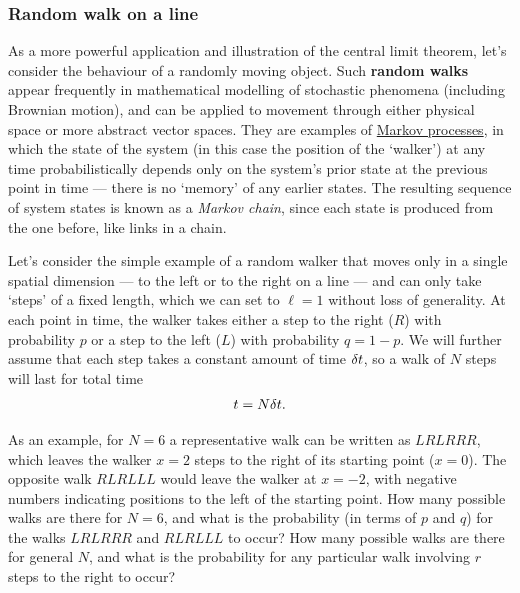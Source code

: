 \subsubsection{Random walk on a line}
As a more powerful application and illustration of the central limit theorem, let's consider the behaviour of a randomly moving object.
Such \textbf{random walks} appear frequently in mathematical modelling of stochastic phenomena (including Brownian motion), and can be applied to movement through either physical space or more abstract vector spaces.
They are examples of \href{https://en.wikipedia.org/wiki/Markov_process}{Markov processes}, in which the state of the system (in this case the position of the `walker') at any time probabilistically depends only on the system's prior state at the previous point in time --- there is no `memory' of any earlier states. %
The resulting sequence of system states is known as a \textit{Markov chain}, since each state is produced from the one before, like links in a chain. %

Let's consider the simple example of a random walker that moves only in a single spatial dimension --- to the left or to the right on a line --- and can only take `steps' of a fixed length, which we can set to $\ell = 1$ without loss of generality.
At each point in time, the walker takes either a step to the right ($R$) with probability $p$ or a step to the left ($L$) with probability $q = 1 - p$.
We will further assume that each step takes a constant amount of time $\delta t$, so a walk of $N$ steps will last for total time
\begin{equation}
  \label{eq:RWtime}
  t = N \delta t.
\end{equation}

As an example, for $N = 6$ a representative walk can be written as $LRLRRR$, which leaves the walker $x = 2$ steps to the right of its starting point ($x = 0$).
The opposite walk $RLRLLL$ would leave the walker at $x = -2$, with negative numbers indicating positions to the left of the starting point.
How many possible walks are there for $N = 6$, and what is the probability (in terms of $p$ and $q$) for the walks $LRLRRR$ and $RLRLLL$ to occur?
How many possible walks are there for general $N$, and what is the probability for any particular walk involving $r$ steps to the right to occur?
\begin{mdframed}
  \ \\[80 pt]
\end{mdframed}


